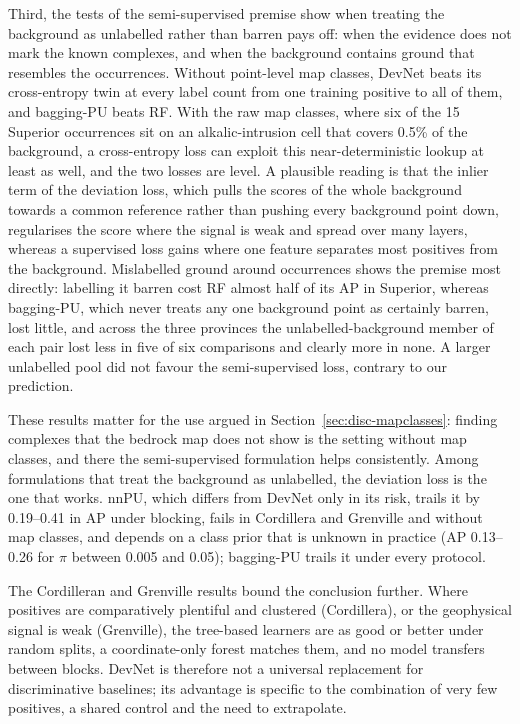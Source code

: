 \documentclass[pdflatex,sn-apa]{sn-jnl}
\begin{document}
Third, the tests of the semi-supervised premise show when treating the background as unlabelled rather than barren pays off: when the evidence does not mark the known complexes, and when the background contains ground that resembles the occurrences. Without point-level map classes, DevNet beats its cross-entropy twin at every label count from one training positive to all of them, and bagging-PU beats RF. With the raw map classes, where six of the 15 Superior occurrences sit on an alkalic-intrusion cell that covers 0.5\% of the background, a cross-entropy loss can exploit this near-deterministic lookup at least as well, and the two losses are level. A plausible reading is that the inlier term of the deviation loss, which pulls the scores of the whole background towards a common reference rather than pushing every background point down, regularises the score where the signal is weak and spread over many layers, whereas a supervised loss gains where one feature separates most positives from the background. Mislabelled ground around occurrences shows the premise most directly: labelling it barren cost RF almost half of its AP in Superior, whereas bagging-PU, which never treats any one background point as certainly barren, lost little, and across the three provinces the unlabelled-background member of each pair lost less in five of six comparisons and clearly more in none. A larger unlabelled pool did not favour the semi-supervised loss, contrary to our prediction.

These results matter for the use argued in Section~\ref{sec:disc-mapclasses}: finding complexes that the bedrock map does not show is the setting without map classes, and there the semi-supervised formulation helps consistently. Among formulations that treat the background as unlabelled, the deviation loss is the one that works. nnPU, which differs from DevNet only in its risk, trails it by 0.19--0.41 in AP under blocking, fails in Cordillera and Grenville and without map classes, and depends on a class prior that is unknown in practice (AP 0.13--0.26 for $\pi$ between 0.005 and 0.05); bagging-PU trails it under every protocol.

The Cordilleran and Grenville results bound the conclusion further. Where positives are comparatively plentiful and clustered (Cordillera), or the geophysical signal is weak (Grenville), the tree-based learners are as good or better under random splits, a coordinate-only forest matches them, and no model transfers between blocks. DevNet is therefore not a universal replacement for discriminative baselines; its advantage is specific to the combination of very few positives, a shared control and the need to extrapolate.
\end{document}
